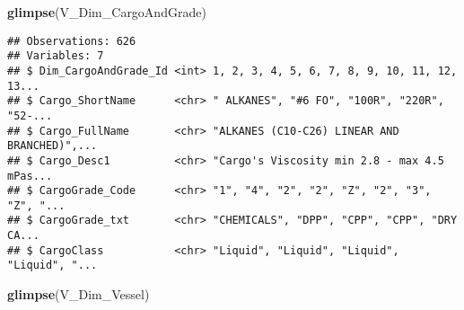 \documentclass[]{article}
\newenvironment{Shaded}{\begin{snugshade}}{\end{snugshade}}
\newcommand{\KeywordTok}[1]{\textcolor[rgb]{0.13,0.29,0.53}{\textbf{#1}}}
\newcommand{\NormalTok}[1]{#1}
\begin{document}
\begin{Shaded}
\begin{Highlighting}[]
\KeywordTok{glimpse}\NormalTok{(V_Dim_CargoAndGrade)}
\end{Highlighting}
\end{Shaded}

\begin{verbatim}
## Observations: 626
## Variables: 7
## $ Dim_CargoAndGrade_Id <int> 1, 2, 3, 4, 5, 6, 7, 8, 9, 10, 11, 12, 13...
## $ Cargo_ShortName      <chr> " ALKANES", "#6 FO", "100R", "220R", "52-...
## $ Cargo_FullName       <chr> "ALKANES (C10-C26) LINEAR AND BRANCHED)",...
## $ Cargo_Desc1          <chr> "Cargo's Viscosity min 2.8 - max 4.5 mPas...
## $ CargoGrade_Code      <chr> "1", "4", "2", "2", "Z", "2", "3", "Z", "...
## $ CargoGrade_txt       <chr> "CHEMICALS", "DPP", "CPP", "CPP", "DRY CA...
## $ CargoClass           <chr> "Liquid", "Liquid", "Liquid", "Liquid", "...
\end{verbatim}

\begin{Shaded}
\begin{Highlighting}[]
\KeywordTok{glimpse}\NormalTok{(V_Dim_Vessel)}
\end{Highlighting}
\end{Shaded}
\end{document}
